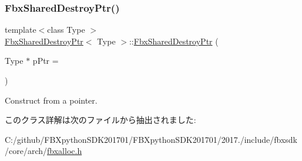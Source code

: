\subsubsection{\texorpdfstring{Fbx\+Shared\+Destroy\+Ptr()}{FbxSharedDestroyPtr()}}
{\footnotesize\ttfamily template$<$class Type $>$ \\
\hyperlink{class_fbx_shared_destroy_ptr}{Fbx\+Shared\+Destroy\+Ptr}$<$ Type $>$\+::\hyperlink{class_fbx_shared_destroy_ptr}{Fbx\+Shared\+Destroy\+Ptr} (\begin{DoxyParamCaption}\item[{Type $\ast$}]{p\+Ptr = {} }\end{DoxyParamCaption})\hspace{0.3cm}{\ttfamily [explicit]}}



Construct from a pointer. 



このクラス詳解は次のファイルから抽出されました\+:\begin{DoxyCompactItemize}
\item 
C\+:/github/\+F\+B\+Xpython\+S\+D\+K201701/\+F\+B\+Xpython\+S\+D\+K201701/2017./include/fbxsdk/core/arch/\hyperlink{fbxalloc_8h}{fbxalloc.\+h}\end{DoxyCompactItemize}
